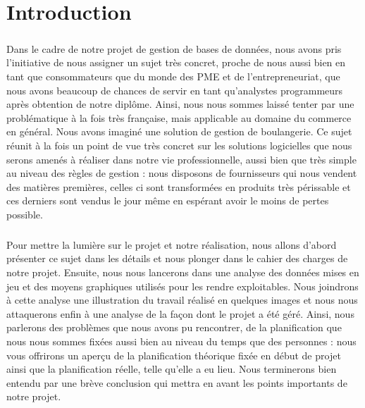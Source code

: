 \chapter*{Introduction}

\paragraph{}
    Dans le cadre de notre projet de gestion de bases de données,
    nous avons pris l'initiative de nous assigner un sujet très concret,
    proche de nous aussi bien en tant que consommateurs que du monde des PME et
    de l'entrepreneuriat, que nous avons beaucoup de chances de servir en tant
    qu'analystes programmeurs après obtention de notre diplôme.
    Ainsi, nous nous sommes laissé tenter par une problématique à la fois très
    française, mais applicable au domaine du commerce en général.
    Nous avons imaginé une solution de gestion de boulangerie.
    Ce sujet réunit à la fois un point de vue très concret sur les solutions
    logicielles que nous serons amenés à réaliser dans notre vie
    professionnelle, aussi bien que très simple au niveau des règles de
    gestion : nous disposons de fournisseurs qui nous vendent des matières
    premières, celles ci sont transformées en produits très périssable et ces
    derniers sont vendus le jour même en espérant avoir le moins de pertes
    possible.
\paragraph{}
    Pour mettre la lumière sur le projet et notre réalisation, nous allons 
    d'abord présenter ce sujet dans les détails et nous plonger dans le cahier
    des charges de notre projet. Ensuite, nous nous lancerons dans une analyse
    des données mises en jeu et des moyens graphiques utilisés pour
    les rendre exploitables.
    Nous joindrons à cette analyse une illustration du travail réalisé en
    quelques images et nous nous attaquerons enfin à une analyse de la façon dont le
    projet a été géré. Ainsi, nous parlerons des problèmes que nous avons pu
    rencontrer, de la planification que nous nous sommes fixées aussi bien au
    niveau du temps que des personnes : nous vous offrirons un aperçu de la 
    planification théorique fixée en début de projet ainsi que la planification
    réelle, telle qu'elle a eu lieu. Nous terminerons bien entendu par une
    brève conclusion qui mettra en avant les points importants de notre projet.
